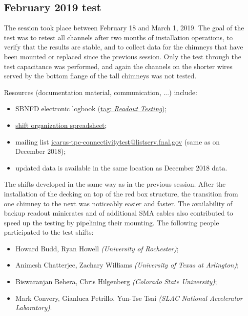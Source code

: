 \subsection{February 2019 test}
\label{ssec:operations:February2019}

The session took place between February 18 and March 1, 2019.
The goal of the test was to retest all channels after two months of installation
operations, to verify that the results are stable, and to collect data for the
chimneys that have been mounted or replaced since the previous session.
Only the test through the test capacitance was performed, and again the channels
on the shorter wires served by the bottom flange of the tall chimneys was not
tested.

Resources (documentation material, communication, ...) include:
\begin{itemize}
  \item SBNFD electronic logbook
    (\href{http://dbweb6.fnal.gov:8080/ECL/sbnfd/E/search?id=&id_from=&id_to=&t_after=02\%2F18\%2F2019&t_before=03\%2F01\%2F2019&tag\%3AReadout+Testing=on&action=Search}{tag: \emph{Readout Testing}});
  \item \href{https://docs.google.com/spreadsheets/d/1wwkhF9-X4gV3Hmp61LN8EbjIY5xaMLv4yKINKjvRKVQ/edit?usp=sharing}{shift organization spreadsheet};
  \item mailing list \href{https://listserv.fnal.gov/scripts/wa.exe?A0=ICARUS-TPC-CONNECTIVITYTEST}{icarus-tpc-connectivitytest@listserv.fnal.gov}
    (same as on December 2018);
  \item updated data is available in the same location as December 2018 data.
\end{itemize}

The shifts developed in the same way as in the previous session.
After the installation of the decking on top of the red box structure, the
transition from one chimney to the next was noticeably easier and faster.
The availability of backup readout minicrates and of additional SMA cables also
contributed to speed up the testing by pipelining their mounting.
The following people participated to the test shifts:
\begin{itemize}
  \item Howard Budd, Ryan Howell \emph{(University of Rochester)};
  \item Animesh Chatterjee, Zachary Williams \emph{(University of Texas at Arlington)};
  \item Biswaranjan Behera, Chris Hilgenberg \emph{(Colorado State University)};
  \item Mark Convery, Gianluca Petrillo, Yun-Tse Tsai \emph{(SLAC National Accelerator Laboratory)}.
\end{itemize}


